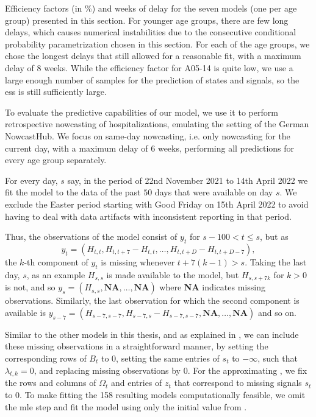 \begin{table}
    \centering
    
    \caption{Efficiency factors (in \%) and weeks of delay for the seven models (one per age group) presented in this section. For younger age groups, there are few long delays, which causes numerical instabilities due to the consecutive conditional probability parametrization chosen in this section. For each of the age groups, we chose the longest delays that still allowed for a reasonable fit, with a maximum delay of $8$ weeks. While the efficiency factor for A05-14 is quite low, we use a large enough number of samples for the prediction of states and signals, so the \acrshort{ess} is still sufficiently large.}
    \label{tab:hospitalization_showcase_ess}
\end{table}






To evaluate the predictive capabilities of our model, we use it to perform retrospective nowcasting of hospitalizations, emulating the setting of the German NowcastHub. 
We focus on same-day nowcasting, i.e. only nowcasting for the current day, with a maximum delay of $6$ weeks,   performing all predictions for every age group separately. 

For every day, $s$ say, in the period of 22nd November 2021 to 14th April 2022 we fit the model to the data of the past $50$ days that were available on day $s$. 
We exclude the Easter period starting with Good Friday on 15th April 2022 to avoid having to deal with data artifacts with inconsistent reporting in that period.

Thus, the observations of the model consist of $y_{t}$ for $s - 100 < t \leq s$, but as 
$$
    y_{t} = \left( H_{t,t}, H_{t, t + 7} - H_{t,t}, \dots, H_{t, t + D}  - H_{t,t + D - 7}\right),
$$
the $k$-th component of $y_{t}$ is missing whenever $t + 7(k - 1) > s$. 
Taking the last day, $s$, as an example $H_{s,s}$ is made available to the model, but $H_{s, s+7k}$ for $k > 0$ is not, and so $y_{s} = \left( H_{s,s}, \textbf{NA}, \dots, \textbf{NA} \right)$ where \textbf{NA} indicates missing observations. Similarly, the last observation for which the second component is available is $y_{s - 7} = \left( H_{s-7, s-7}, H_{s-7, s} - H_{s - 7, s - 7}, \textbf{NA}, \dots, \textbf{NA} \right)$ and so on. 

Similar to the other models in this thesis, and as explained in , we can include these missing observations in a straightforward manner, by setting the corresponding rows of $B_{t}$ to $0$, setting the same entries of $s_{t}$ to $-\infty$, such that $\lambda_{t,k} = 0$, and replacing missing observations by $0$. For the approximating , we fix the rows and columns of $\Omega_{t}$ and entries of $z_{t}$ that correspond to missing signals $s_{t}$ to $0$. 
To make fitting the 158 resulting models computationally feasible, we omit the \acrshort{mle} step and fit the model using only the initial value from . 

